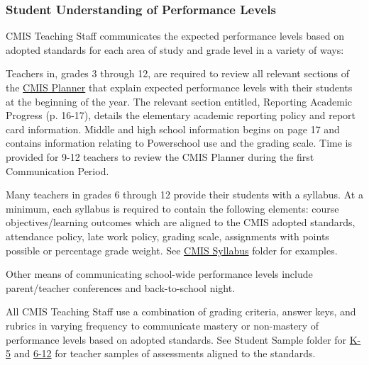 \subsubsection{Student Understanding of Performance Levels}



\begin{findings}
CMIS Teaching Staff communicates the expected performance levels based on adopted standards for each area of study and grade level in a variety of ways:


Teachers in, grades 3 through 12, are required to review all relevant sections of the \href{https://drive.google.com/file/d/0B8vOjwyFoCioQ2tNak04WGd3Mm8/view?usp=sharing}{CMIS Planner} that explain expected performance levels with their students at the beginning of the year. The relevant section entitled, Reporting Academic Progress (p. 16-17), details the elementary academic reporting policy and report card information. Middle and high school information begins on page 17 and contains information relating to Powerschool use and the grading scale. Time is provided for 9-12 teachers to review the CMIS Planner during the first Communication Period. 


Many teachers in grades 6 through 12 provide their students with a syllabus. At a minimum, each syllabus is required to contain the following elements: course objectives/learning outcomes which are aligned to the CMIS adopted standards, attendance policy, late work policy, grading scale, assignments with points possible or percentage grade weight. See \href{https://drive.google.com/drive/folders/0ByVFfrm0zfolNmdnMzU2S2xRSWs?usp=sharing}{CMIS Syllabus} folder for examples. 

Other means of communicating school-wide performance levels include parent/teacher conferences and back-to-school night.  


All CMIS Teaching Staff use a combination of grading criteria, answer keys, and rubrics in varying frequency to communicate mastery or non-mastery of performance levels based on adopted standards. See Student Sample folder for \href{https://drive.google.com/drive/folders/0ByVFfrm0zfolVGJzdXpvLV9reVk?usp=sharing}{K-5} and  \href{https://drive.google.com/drive/folders/0ByVFfrm0zfolMkF5aThoSzZxa1E?usp=sharing}{6-12} for teacher samples of assessments aligned to the standards. 


\end{findings}
